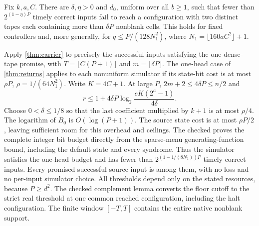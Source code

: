 \begin{theorem}\label{thm:stores}
Fix $k,a,C$. There are $\delta,\eta>0$ and $d_0$, uniform over all $b\ge1$,
such that fewer than $2^{(1-\eta)P}$ timely correct inputs fail to reach a
configuration with two distinct tapes each containing more than $\delta P$
nonblank cells. This holds for fixed controllers and, more generally, for
$q\le P/(128N_1^2)$, where $N_1=\lfloor160aC^2\rfloor+1$.
\end{theorem}
\begin{informalproof}
Apply \cref{thm:carrier} to precisely the successful inputs satisfying the
one-dense-tape promise, with $T=\lfloor C(P+1)\rfloor$ and
$m=\lfloor\delta P\rfloor$. The one-head case of \cref{thm:returns} applies
to each nonuniform simulator if its state-bit cost is at most
$\rho P$, $\rho=1/(64N_1^2)$. Write $K=4C+1$. At large $P$,
$2m+2\le4\delta P\le n/2$ and
\[
 r\le1+4\delta P\log_2\frac{eK(2^a-1)}{4\delta}.
\]
Choose $0<\delta\le1/8$ so that the last coefficient multiplied by $k+1$
is at most $\rho/4$. The logarithm of $B_0$ is $O(\log(P+1))$. The source
state cost is at most $\rho P/2$, leaving sufficient room for this overhead
and ceilings. The checked  proves the complete
integer bit budget directly from the sparse-menu generating-function bound,
including the default state and every syndrome. Thus the simulator satisfies
the one-head budget and has fewer
than $2^{(1-1/(8N_1))P}$ timely correct inputs. Every promised successful
source input is among them, with no loss and no per-input simulator choice.
All thresholds depend only on the stated resources, because $P\ge d^2$.
The checked complement lemma converts the floor cutoff to the strict real
threshold at one common reached configuration, including the halt configuration.
The finite window $[-T,T]$ contains the entire native nonblank support.
\end{informalproof}

